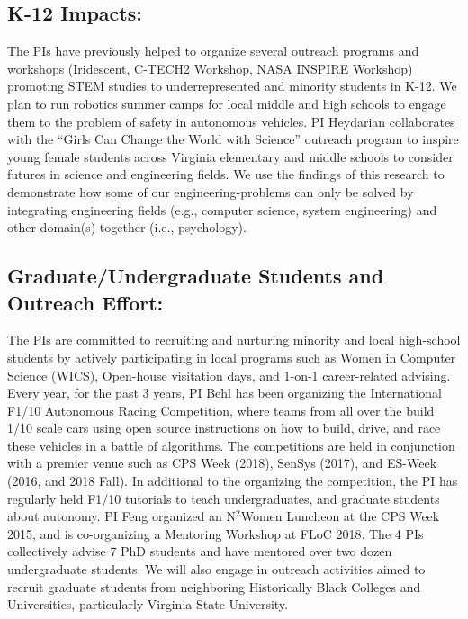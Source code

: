 \subsection{K-12 Impacts:}
The PIs have previously helped to organize several outreach programs and workshops (Iridescent, C-TECH2 Workshop, NASA INSPIRE Workshop) promoting STEM studies to underrepresented and minority students in K-12. 
We plan to run robotics summer camps for local middle and high schools to engage them to the problem of safety in autonomous vehicles.
PI Heydarian collaborates with the ``Girls Can Change the World with Science'' outreach program to inspire young female students across Virginia elementary and middle schools to consider futures in science and engineering fields. We use the findings of this research to demonstrate how some of our engineering-problems can only be solved by integrating engineering fields (e.g., computer science, system engineering) and other domain(s) together (i.e., psychology). 

\subsection{Graduate/Undergraduate Students and Outreach Effort:}
The PIs are committed to recruiting and nurturing minority and local high-school students by actively participating in local programs such as Women in Computer Science (WICS),  Open-house visitation days, and 1-on-1 career-related advising.
Every year, for the past 3 years, PI Behl has been organizing the International F1/10 Autonomous Racing Competition, where teams from all over the build 1/10 scale cars using open source instructions on how to build, drive, and race these vehicles in a battle of algorithms. The competitions are held in conjunction with a premier venue such as CPS Week (2018), SenSys (2017), and ES-Week (2016, and 2018 Fall). In additional to the organizing the competition, the PI has regularly held F1/10 tutorials to teach undergraduates, and graduate students about autonomy. 
PI Feng organized an N$^2$Women Luncheon at the CPS Week 2015, and is co-organizing a Mentoring Workshop at FLoC 2018. The 4 PIs collectively advise 7 PhD students and have mentored over two dozen undergraduate students.
We will also engage in outreach activities aimed to recruit graduate students from neighboring Historically Black Colleges and Universities, particularly Virginia State University.

